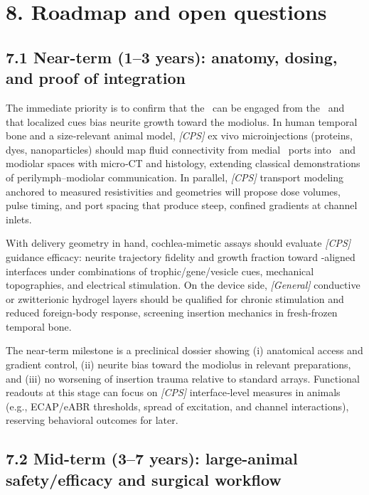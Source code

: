 \section*{8. Roadmap and open questions}

\subsection*{7.1 Near-term (1--3 years): anatomy, dosing, and proof of integration}

The immediate priority is to confirm that the \CPS\ can be engaged from the \ST\ and that localized cues bias neurite growth toward the modiolus. In human temporal bone and a size‐relevant animal model, \textit{[CPS]} ex vivo microinjections (proteins, dyes, nanoparticles) should map fluid connectivity from medial \ST\ ports into \CPS\ and modiolar spaces with micro‐CT and histology, extending classical demonstrations of perilymph–modiolar communication.\cite{raskandersen2006, sando1971, masuda1971, lim1970} In parallel, \textit{[CPS]} transport modeling anchored to measured resistivities and geometries will propose dose volumes, pulse timing, and port spacing that produce steep, confined gradients at channel inlets.\cite{Micco2006, nella2023} 

With delivery geometry in hand, cochlea‐mimetic assays should evaluate \textit{[CPS]} guidance efficacy: neurite trajectory fidelity and growth fraction toward \CPS‐aligned interfaces under combinations of trophic/gene/vesicle cues, mechanical topographies, and electrical stimulation.\cite{Kempfle2021, StPeter2022, Chang2020, Scheper2019, tan2012, CarnicerLombarte2024AdvMat} On the device side, \textit{[General]} conductive or zwitterionic hydrogel layers should be qualified for chronic stimulation and reduced foreign‐body response, screening insertion mechanics in fresh‐frozen temporal bone.\cite{Dalrymple2020, Horne2023, Rebscher2008, Sheykholeslami2002} 

The near‐term milestone is a preclinical dossier showing (i) anatomical access and gradient control, (ii) neurite bias toward the modiolus in relevant preparations, and (iii) no worsening of insertion trauma relative to standard arrays. Functional readouts at this stage can focus on \textit{[CPS]} interface‐level measures in animals (e.g., ECAP/eABR thresholds, spread of excitation, and channel interactions), reserving behavioral outcomes for later.\cite{wilson2008, wilson2014}

\subsection*{7.2 Mid-term (3--7 years): large-animal safety/efficacy and surgical workflow}

